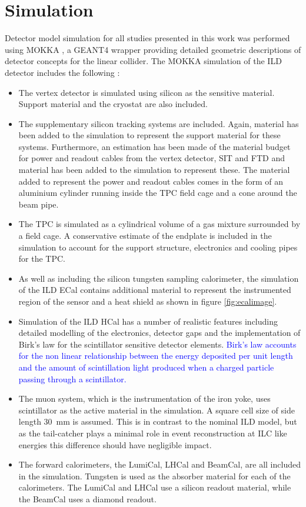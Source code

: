 \section{Simulation}
\label{sec:simulation}
Detector model simulation for all studies presented in this work was performed using MOKKA \cite{MoradeFreitas:2002kj}, a GEANT4 \cite{Agostinelli:2002hh,Allison:2006ve} wrapper providing detailed geometric descriptions of detector concepts for the linear collider.  The MOKKA simulation of the ILD detector includes the following \cite{Behnke:2013lya}:
\begin{itemize}
\item The vertex detector is simulated using silicon as the sensitive material.  Support material and the cryostat are also included.
\item The supplementary silicon tracking systems are included.  Again, material has been added to the simulation to represent the support material for these systems.  Furthermore, an estimation has been made of the material budget for power and readout cables from the vertex detector, SIT and FTD and material has been added to the simulation to represent these.  The material added to represent the power and readout cables comes in the form of an aluminium cylinder running inside the TPC field cage and a cone around the beam pipe.
\item The TPC is simulated as a cylindrical volume of a gas mixture surrounded by a field cage.  A conservative estimate of the endplate is included in the simulation to account for the support structure, electronics and cooling pipes for the TPC.
\item As well as including the silicon tungsten sampling calorimeter, the simulation of the ILD ECal contains additional material to represent the instrumented region of the sensor and a heat shield as shown in figure \ref{fig:ecalimage}.
\item Simulation of the ILD HCal has a number of realistic features including detailed modelling of the electronics, detector gaps and the implementation of Birk's law \cite{Birks:1951boa} for the scintillator sensitive detector elements.  \textcolor{blue}{Birk's law accounts for the non linear relationship between the energy deposited per unit length and the amount of scintillation light produced when a charged particle passing through a scintillator.}
\item The muon system, which is the instrumentation of the iron yoke, uses scintillator as the active material in the simulation.  A square cell size of side length 30~mm is assumed.  This is in contrast to the nominal ILD model, but as the tail-catcher plays a minimal role in event reconstruction at ILC like energies this difference should have negligible impact.  
\item The forward calorimeters, the LumiCal, LHCal and BeamCal, are all included in the simulation.  Tungsten is used as the absorber material for each of the calorimeters.  The LumiCal and LHCal use a silicon readout material, while the BeamCal uses a diamond readout.  
\end{itemize}

